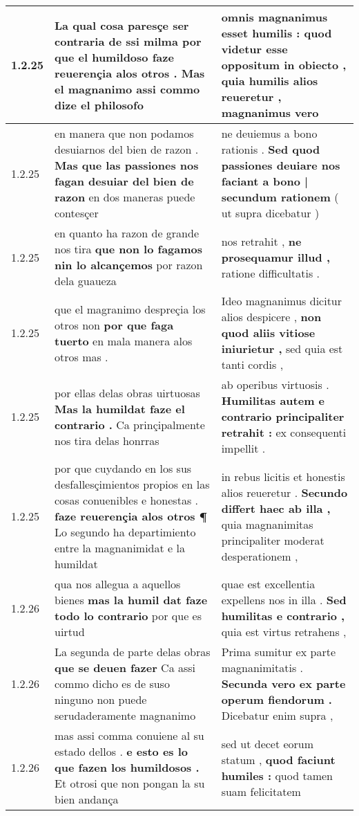 \begin{tabular}{|p{1cm}|p{6.5cm}|p{6.5cm}|}
1.2.25 & La qual cosa paresçe ser contraria de ssi milma \textbf{ por que el humildoso faze reuerençia alos otros . } Mas el magnanimo assi commo dize el philosofo & omnis magnanimus esset humilis : \textbf{ quod videtur esse oppositum in obiecto , quia humilis alios reueretur , } magnanimus vero \\\hline
1.2.25 & en manera que non podamos desuiarnos del bien de razon . \textbf{ Mas que las passiones nos fagan desuiar del bien de razon } en dos maneras puede contesçer & ne deuiemus a bono rationis . \textbf{ Sed quod passiones deuiare nos faciant a bono | secundum rationem } ( ut supra dicebatur ) \\\hline
1.2.25 & en quanto ha razon de grande nos tira \textbf{ que non lo fagamos nin lo alcançemos } por razon dela guaueza & nos retrahit , \textbf{ ne prosequamur illud , } ratione difficultatis . \\\hline
1.2.25 & que el magranimo despreçia los otros non \textbf{ por que faga tuerto } en mala manera alos otros mas . & Ideo magnanimus dicitur alios despicere , \textbf{ non quod aliis vitiose iniurietur , } sed quia est tanti cordis , \\\hline
1.2.25 & por ellas delas obras uirtuosas \textbf{ Mas la humildat faze el contrario . } Ca prinçipalmente nos tira delas honrras & ab operibus virtuosis . \textbf{ Humilitas autem e contrario principaliter retrahit : } ex consequenti impellit . \\\hline
1.2.25 & por que cuydando en los sus desfallesçimientos propios en las cosas conuenibles e honestas . \textbf{ faze reuerençia alos otros ¶ } Lo segundo ha departimiento entre la magnanimidat e la humildat & in rebus licitis et honestis alios reueretur . \textbf{ Secundo differt haec ab illa , } quia magnanimitas principaliter moderat desperationem , \\\hline
1.2.26 & qua nos allegua a aquellos bienes \textbf{ mas la humil dat faze todo lo contrario } por que es uirtud & quae est excellentia expellens nos in illa . \textbf{ Sed humilitas e contrario , } quia est virtus retrahens , \\\hline
1.2.26 & La segunda de parte delas obras \textbf{ que se deuen fazer } Ca assi commo dicho es de suso ninguno non puede serudaderamente magnanimo & Prima sumitur ex parte magnanimitatis . \textbf{ Secunda vero ex parte operum fiendorum . } Dicebatur enim supra , \\\hline
1.2.26 & mas assi comma conuiene al su estado dellos . \textbf{ e esto es lo que fazen los humildosos . } Et otrosi que non pongan la su bien andança & sed ut decet eorum statum , \textbf{ quod faciunt humiles : } quod tamen suam felicitatem \\\hline

\end{tabular}
